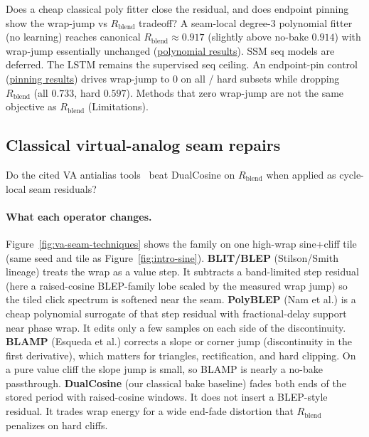 Does a cheap classical poly fitter close the residual, and does endpoint pinning show the wrap-jump vs $R_{\mathrm{blend}}$ tradeoff?
A seam-local degree-3 polynomial fitter (no learning) reaches canonical $R_{\mathrm{blend}}\approx 0.917$ (slightly above no-bake $0.914$) with wrap-jump essentially unchanged (\href{https://github.com/reeldemo/denoise-opt-meta/blob/master/paper/Unsupervised_Wrap-Discontinuity_Repair_in_Wavetable_Synthesis_via_Hybrid_GA-PPO_Meta-Search_v12/figures/poly_baseline.json}{polynomial results}).
SSM seq models are deferred. The LSTM remains the supervised seq ceiling.
An endpoint-pin control (\href{https://github.com/reeldemo/denoise-opt-meta/blob/master/paper/Unsupervised_Wrap-Discontinuity_Repair_in_Wavetable_Synthesis_via_Hybrid_GA-PPO_Meta-Search_v12/figures/jump_control.json}{pinning results}) drives wrap-jump to $0$ on all / hard subsets while dropping $R_{\mathrm{blend}}$ (all $0.733$, hard $0.597$).
Methods that zero wrap-jump are not the same objective as $R_{\mathrm{blend}}$ (Limitations).

\subsection{Classical virtual-analog seam repairs}
\label{sec:va-seam-baselines}

Do the cited VA antialias tools~\cite{stilson1996,nam2009polyblep,esqueda2016blamp} beat DualCosine on $R_{\mathrm{blend}}$ when applied as cycle-local seam residuals?

\paragraph{What each operator changes.}
Figure~\ref{fig:va-seam-techniques} shows the family on one high-wrap sine{+}cliff tile (same seed and tile as Figure~\ref{fig:intro-sine}).
\textbf{BLIT/BLEP} (Stilson/Smith lineage) treats the wrap as a value step.
It subtracts a band-limited step residual (here a raised-cosine BLEP-family lobe scaled by the measured wrap jump) so the tiled click spectrum is softened near the seam.
\textbf{PolyBLEP} (Nam et al.) is a cheap polynomial surrogate of that step residual with fractional-delay support near phase wrap.
It edits only a few samples on each side of the discontinuity.
\textbf{BLAMP} (Esqueda et al.) corrects a slope or corner jump (discontinuity in the first derivative), which matters for triangles, rectification, and hard clipping.
On a pure value cliff the slope jump is small, so BLAMP is nearly a no-bake passthrough.
\textbf{DualCosine} (our classical bake baseline) fades both ends of the stored period with raised-cosine windows.
It does not insert a BLEP-style residual.
It trades wrap energy for a wide end-fade distortion that $R_{\mathrm{blend}}$ penalizes on hard cliffs.


